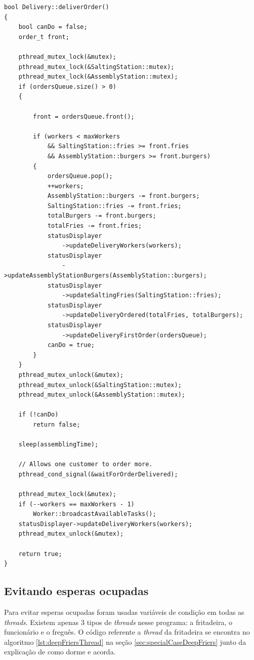 \documentclass[a4paper]{article}
\begin{document}
\begin{lstlisting}[caption=Entrega de pedido no módulo de \textit{Delivery}.\label{lst:orderDelivery}]
bool Delivery::deliverOrder()
{
	bool canDo = false;
	order_t front;
	
	pthread_mutex_lock(&mutex);
	pthread_mutex_lock(&SaltingStation::mutex);
	pthread_mutex_lock(&AssemblyStation::mutex);
	if (ordersQueue.size() > 0)
	{
		
		front = ordersQueue.front();
		
		if (workers < maxWorkers 
			&& SaltingStation::fries >= front.fries 
			&& AssemblyStation::burgers >= front.burgers)
		{
			ordersQueue.pop();
			++workers;
			AssemblyStation::burgers -= front.burgers;
			SaltingStation::fries -= front.fries;
			totalBurgers -= front.burgers;
			totalFries -= front.fries;
			statusDisplayer
				->updateDeliveryWorkers(workers);
			statusDisplayer
				->updateAssemblyStationBurgers(AssemblyStation::burgers);
			statusDisplayer
				->updateSaltingFries(SaltingStation::fries);
			statusDisplayer
				->updateDeliveryOrdered(totalFries, totalBurgers);
			statusDisplayer
				->updateDeliveryFirstOrder(ordersQueue);
			canDo = true;
		}
	}
	pthread_mutex_unlock(&mutex);
	pthread_mutex_unlock(&SaltingStation::mutex);
	pthread_mutex_unlock(&AssemblyStation::mutex);
	
	if (!canDo)
		return false;
	
	sleep(assemblingTime);
	
	// Allows one customer to order more.
	pthread_cond_signal(&waitForOrderDelivered);
	
	pthread_mutex_lock(&mutex);
	if (--workers == maxWorkers - 1)
		Worker::broadcastAvailableTasks();
	statusDisplayer->updateDeliveryWorkers(workers);
	pthread_mutex_unlock(&mutex);
	
	return true;
}	
\end{lstlisting}

\subsection{Evitando esperas ocupadas}
\label{sec:avoidBusyWaits}

Para evitar esperas ocupadas foram usadas variáveis de condição em todas as \textit{threads}. Existem apenas 3 tipos de \textit{threads} nesse programa: a fritadeira, o funcionário e o freguês. O código referente a \textit{thread} da fritadeira se encontra no algoritmo \ref{lst:deepFriersThread} na seção \ref{sec:specialCaseDeepFriers} junto da explicação de como dorme e acorda.
\end{document}
